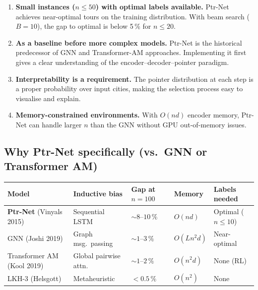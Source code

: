 \documentclass[12pt,a4paper]{article}
\begin{document}
\begin{enumerate}[leftmargin=2em]
  \item \textbf{Small instances ($n \leq 50$) with optimal labels available.}
    Ptr-Net achieves near-optimal tours on the training distribution.
    With beam search ($B = 10$), the gap to optimal is below 5\,\% for
    $n \leq 20$.

  \item \textbf{As a baseline before more complex models.}
    Ptr-Net is the historical predecessor of GNN and Transformer-AM approaches.
    Implementing it first gives a clear understanding of the
    encoder--decoder--pointer paradigm.

  \item \textbf{Interpretability is a requirement.}
    The pointer distribution at each step is a proper probability over input
    cities, making the selection process easy to visualise and explain.

  \item \textbf{Memory-constrained environments.}
    With $O(n d)$ encoder memory, Ptr-Net can handle larger $n$ than the GNN
    without GPU out-of-memory issues.
\end{enumerate}

\subsection*{Why Ptr-Net specifically (vs.\ GNN or Transformer AM)}

\begin{center}
\begin{tabularx}{\linewidth}{lXXXX}
\toprule
\textbf{Model} & \textbf{Inductive bias} & \textbf{Gap at $n=100$} &
  \textbf{Memory} & \textbf{Labels needed} \\
\midrule
\textbf{Ptr-Net} (Vinyals 2015) & Sequential LSTM
  & ${\sim}8$--$10\,\%$ & $O(nd)$ & Optimal ($n \leq 10$) \\
GNN (Joshi 2019)          & Graph msg.\ passing
  & ${\sim}1$--$3\,\%$  & $O(Ln^2 d)$ & Near-optimal \\
Transformer AM (Kool 2019) & Global pairwise attn.
  & ${\sim}1$--$2\,\%$  & $O(n^2 d)$ & None (RL) \\
LKH-3 (Helsgott)          & Metaheuristic
  & $< 0.5\,\%$         & $O(n^2)$ & None \\
\bottomrule
\end{tabularx}
\end{center}
\end{document}
